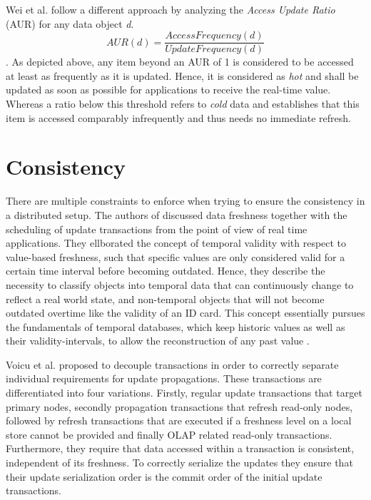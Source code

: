 Wei et al. \cite{wei:2004} follow a different approach by analyzing the \emph{Access Update Ratio} (AUR) for any data object \textit{d}. 
\begin{equation}
AUR(d) = \frac{AccessFrequency(d)}{UpdateFrequency(d)}
\end{equation}. 
As depicted above, any item beyond an AUR of 1 is considered to be accessed at least as frequently as it is updated.
Hence, it is considered as \emph{hot} and shall be updated as soon as possible for applications to receive the real-time value. 
Whereas a ratio below this threshold refers to \emph{cold} data and establishes that this item is accessed comparably infrequently and thus needs no immediate refresh. 






\section{Consistency}
\label{sec:consistency}
There are multiple constraints to enforce when trying to ensure the consistency in a distributed setup.
The authors of \cite{wei:2004, xiang:2008} discussed data freshness together with the scheduling of update transactions from the 
point of view of real time applications. They ellborated the concept of temporal validity with respect to value-based freshness,
such that specific values are only considered valid for a certain time interval before becoming outdated. Hence, they describe the necessity to classify objects into
temporal data that can continuously change to reflect a real world state, and non-temporal objects that will not become outdated overtime like the validity of an ID card.
This concept essentially pursues the fundamentals of temporal databases, which keep historic values as well as their validity-intervals, to allow the reconstruction of any 
past value \cite{etzion:1998}. 

Voicu et al. \cite{voicu:2010} proposed to decouple transactions in order to correctly separate individual requirements for update propagations.
These transactions are differentiated into four variations. Firstly, regular update transactions that target primary nodes, secondly propagation transactions 
that refresh read-only nodes, followed by refresh transactions that are executed if a freshness level on a local store cannot be provided and 
finally OLAP related read-only transactions.
Furthermore, they require that data accessed within a transaction is consistent, independent of its freshness. To correctly serialize the updates
they ensure that their update serialization order is the commit order of the initial update transactions.\\

